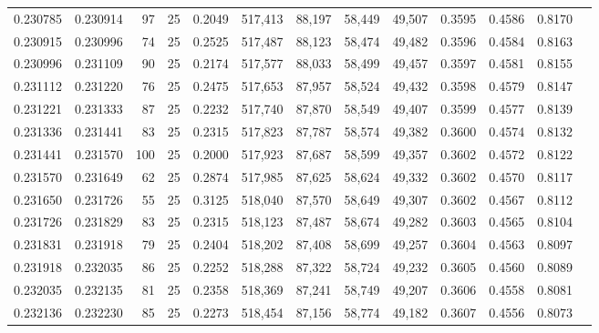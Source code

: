 \begin{tabular}{rrrrrrrrrrrrr}
0.230785 & 0.230914 &    97 &  25 &                                     0.2049 & 517,413 &  88,197 &  58,449 &  49,507 & 0.3595 & 0.4586 & 0.8170 \\
0.230915 & 0.230996 &    74 &  25 &                                     0.2525 & 517,487 &  88,123 &  58,474 &  49,482 & 0.3596 & 0.4584 & 0.8163 \\
0.230996 & 0.231109 &    90 &  25 &                                     0.2174 & 517,577 &  88,033 &  58,499 &  49,457 & 0.3597 & 0.4581 & 0.8155 \\
0.231112 & 0.231220 &    76 &  25 &                                     0.2475 & 517,653 &  87,957 &  58,524 &  49,432 & 0.3598 & 0.4579 & 0.8147 \\
0.231221 & 0.231333 &    87 &  25 &                                     0.2232 & 517,740 &  87,870 &  58,549 &  49,407 & 0.3599 & 0.4577 & 0.8139 \\
0.231336 & 0.231441 &    83 &  25 &                                     0.2315 & 517,823 &  87,787 &  58,574 &  49,382 & 0.3600 & 0.4574 & 0.8132 \\
0.231441 & 0.231570 &   100 &  25 &                                     0.2000 & 517,923 &  87,687 &  58,599 &  49,357 & 0.3602 & 0.4572 & 0.8122 \\
0.231570 & 0.231649 &    62 &  25 &                                     0.2874 & 517,985 &  87,625 &  58,624 &  49,332 & 0.3602 & 0.4570 & 0.8117 \\
0.231650 & 0.231726 &    55 &  25 &                                     0.3125 & 518,040 &  87,570 &  58,649 &  49,307 & 0.3602 & 0.4567 & 0.8112 \\
0.231726 & 0.231829 &    83 &  25 &                                     0.2315 & 518,123 &  87,487 &  58,674 &  49,282 & 0.3603 & 0.4565 & 0.8104 \\
0.231831 & 0.231918 &    79 &  25 &                                     0.2404 & 518,202 &  87,408 &  58,699 &  49,257 & 0.3604 & 0.4563 & 0.8097 \\
0.231918 & 0.232035 &    86 &  25 &                                     0.2252 & 518,288 &  87,322 &  58,724 &  49,232 & 0.3605 & 0.4560 & 0.8089 \\
0.232035 & 0.232135 &    81 &  25 &                                     0.2358 & 518,369 &  87,241 &  58,749 &  49,207 & 0.3606 & 0.4558 & 0.8081 \\
0.232136 & 0.232230 &    85 &  25 &                                     0.2273 & 518,454 &  87,156 &  58,774 &  49,182 & 0.3607 & 0.4556 & 0.8073 \\

\end{tabular}
